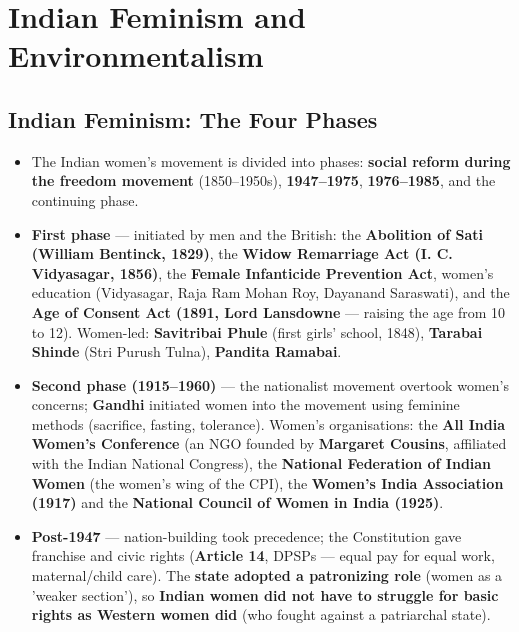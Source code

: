 \chapter{Indian Feminism and Environmentalism}

\section{Indian Feminism: The Four Phases}

\begin{KeyConcept}
\begin{itemize}
\item The Indian women's movement is divided into phases: \textbf{social reform during the freedom movement} (1850--1950s), \textbf{1947--1975}, \textbf{1976--1985}, and the continuing phase.
\item \textbf{First phase} --- initiated by men and the British: the \textbf{Abolition of Sati (William Bentinck, 1829)}, the \textbf{Widow Remarriage Act (I. C. Vidyasagar, 1856)}, the \textbf{Female Infanticide Prevention Act}, women's education (Vidyasagar, Raja Ram Mohan Roy, Dayanand Saraswati), and the \textbf{Age of Consent Act (1891, Lord Lansdowne} --- raising the age from 10 to 12). Women-led: \textbf{Savitribai Phule} (first girls' school, 1848), \textbf{Tarabai Shinde} (Stri Purush Tulna), \textbf{Pandita Ramabai}.
\item \textbf{Second phase (1915--1960)} --- the nationalist movement overtook women's concerns; \textbf{Gandhi} initiated women into the movement using feminine methods (sacrifice, fasting, tolerance). Women's organisations: the \textbf{All India Women's Conference} (an NGO founded by \textbf{Margaret Cousins}, affiliated with the Indian National Congress), the \textbf{National Federation of Indian Women} (the women's wing of the CPI), the \textbf{Women's India Association (1917)} and the \textbf{National Council of Women in India (1925)}.
\item \textbf{Post-1947} --- nation-building took precedence; the Constitution gave franchise and civic rights (\textbf{Article 14}, DPSPs --- equal pay for equal work, maternal/child care). The \textbf{state adopted a patronizing role} (women as a 'weaker section'), so \textbf{Indian women did not have to struggle for basic rights as Western women did} (who fought against a patriarchal state).
\end{itemize}
\end{KeyConcept}

